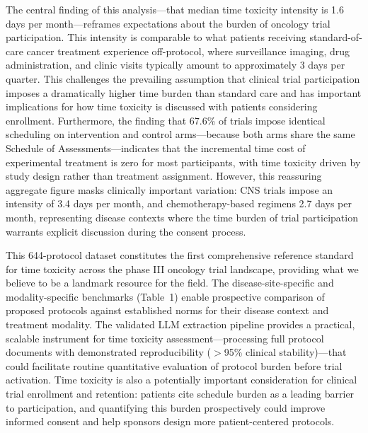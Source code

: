 \documentclass[12pt]{article}
\begin{document}
The central finding of this analysis---that median time toxicity intensity is 1.6 days per month---reframes expectations about the burden of oncology trial participation. This intensity is comparable to what patients receiving standard-of-care cancer treatment experience off-protocol, where surveillance imaging, drug administration, and clinic visits typically amount to approximately 3 days per quarter.\cite{gupta2022} This challenges the prevailing assumption that clinical trial participation imposes a dramatically higher time burden than standard care and has important implications for how time toxicity is discussed with patients considering enrollment. Furthermore, the finding that 67.6\% of trials impose identical scheduling on intervention and control arms---because both arms share the same Schedule of Assessments---indicates that the incremental time cost of experimental treatment is zero for most participants, with time toxicity driven by study design rather than treatment assignment. However, this reassuring aggregate figure masks clinically important variation: CNS trials impose an intensity of 3.4 days per month, and chemotherapy-based regimens 2.7 days per month, representing disease contexts where the time burden of trial participation warrants explicit discussion during the consent process.

This 644-protocol dataset constitutes the first comprehensive reference standard for time toxicity across the phase III oncology trial landscape, providing what we believe to be a landmark resource for the field. The disease-site-specific and modality-specific benchmarks (Table~1) enable prospective comparison of proposed protocols against established norms for their disease context and treatment modality. The validated LLM extraction pipeline provides a practical, scalable instrument for time toxicity assessment---processing full protocol documents with demonstrated reproducibility ($>$95\% clinical stability)---that could facilitate routine quantitative evaluation of protocol burden before trial activation.\cite{companion,topol2023,rajpurkar2022} Time toxicity is also a potentially important consideration for clinical trial enrollment and retention: patients cite schedule burden as a leading barrier to participation,\cite{unger2019,winkfield2018,nipp2019} and quantifying this burden prospectively could improve informed consent and help sponsors design more patient-centered protocols.
\end{document}
